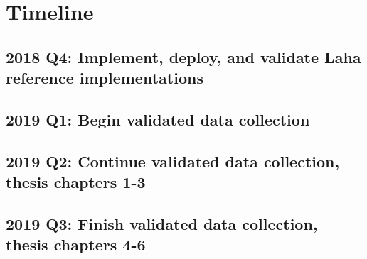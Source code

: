 \section{Timeline}
\subsection{2018 Q4: Implement, deploy, and validate Laha reference implementations}
\subsection{2019 Q1: Begin validated data collection}
\subsection{2019 Q2: Continue validated data collection, thesis chapters 1-3}
\subsection{2019 Q3: Finish validated data collection, thesis chapters 4-6}





